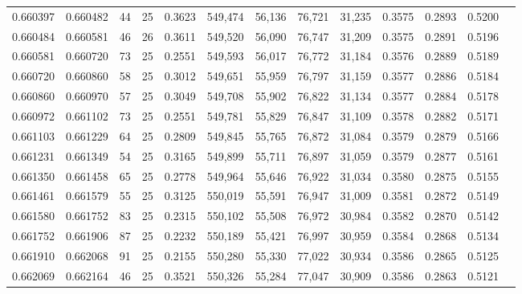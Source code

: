 \begin{tabular}{rrrrrrrrrrrrr}
0.660397 & 0.660482 &    44 &  25 &                                     0.3623 & 549,474 &  56,136 &  76,721 &  31,235 & 0.3575 & 0.2893 & 0.5200 \\
0.660484 & 0.660581 &    46 &  26 &                                     0.3611 & 549,520 &  56,090 &  76,747 &  31,209 & 0.3575 & 0.2891 & 0.5196 \\
0.660581 & 0.660720 &    73 &  25 &                                     0.2551 & 549,593 &  56,017 &  76,772 &  31,184 & 0.3576 & 0.2889 & 0.5189 \\
0.660720 & 0.660860 &    58 &  25 &                                     0.3012 & 549,651 &  55,959 &  76,797 &  31,159 & 0.3577 & 0.2886 & 0.5184 \\
0.660860 & 0.660970 &    57 &  25 &                                     0.3049 & 549,708 &  55,902 &  76,822 &  31,134 & 0.3577 & 0.2884 & 0.5178 \\
0.660972 & 0.661102 &    73 &  25 &                                     0.2551 & 549,781 &  55,829 &  76,847 &  31,109 & 0.3578 & 0.2882 & 0.5171 \\
0.661103 & 0.661229 &    64 &  25 &                                     0.2809 & 549,845 &  55,765 &  76,872 &  31,084 & 0.3579 & 0.2879 & 0.5166 \\
0.661231 & 0.661349 &    54 &  25 &                                     0.3165 & 549,899 &  55,711 &  76,897 &  31,059 & 0.3579 & 0.2877 & 0.5161 \\
0.661350 & 0.661458 &    65 &  25 &                                     0.2778 & 549,964 &  55,646 &  76,922 &  31,034 & 0.3580 & 0.2875 & 0.5155 \\
0.661461 & 0.661579 &    55 &  25 &                                     0.3125 & 550,019 &  55,591 &  76,947 &  31,009 & 0.3581 & 0.2872 & 0.5149 \\
0.661580 & 0.661752 &    83 &  25 &                                     0.2315 & 550,102 &  55,508 &  76,972 &  30,984 & 0.3582 & 0.2870 & 0.5142 \\
0.661752 & 0.661906 &    87 &  25 &                                     0.2232 & 550,189 &  55,421 &  76,997 &  30,959 & 0.3584 & 0.2868 & 0.5134 \\
0.661910 & 0.662068 &    91 &  25 &                                     0.2155 & 550,280 &  55,330 &  77,022 &  30,934 & 0.3586 & 0.2865 & 0.5125 \\
0.662069 & 0.662164 &    46 &  25 &                                     0.3521 & 550,326 &  55,284 &  77,047 &  30,909 & 0.3586 & 0.2863 & 0.5121 \\

\end{tabular}
